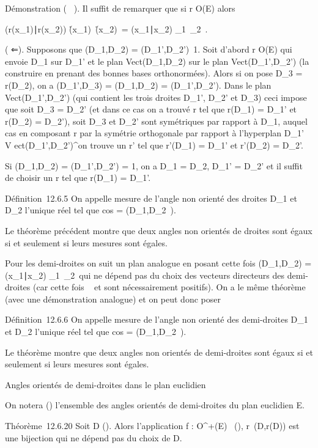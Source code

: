 \documentclass[]{article}
\begin{document}
Démonstration ( \rigtharrow~). Il suffit de remarquer que si r \in O(E) alors


(r(x_1)∣r(x_2))
\over
\r(x_1)\
\r(x_2)\
=
(x_1∣x_2)
\over
\x_1\
\x_2\ .

( ⇐). Supposons que \phi(D_1,D_2) =
\phi(D_1',D_2')\neq~1. Soit
d'abord r \in O(E) qui envoie D_1 sur D_1' et le plan
Vect(D_1,D_2) sur le plan
Vect(D_1',D_2') (la construire en prenant des bonnes
bases orthonormées). Alors si on pose D_3 = r(D_2), on
a \phi(D_1',D_3) = \phi(D_1,D_2) =
\phi(D_1',D_2'). Dans le plan
Vect(D_1',D_2') (qui contient les trois droites
D_1', D_2' et D_3) ceci impose que soit
D_3 = D_2' (et dans ce cas on a trouvé r tel que
r(D_1) = D_1' et r(D_2) = D_2'),
soit D_3 et D_2' sont symétriques par rapport à
D_1, auquel cas en composant r par la symétrie orthogonale par
rapport à l'hyperplan D_1' \oplus~ V
ect(D_1',D_2')^\bot on trouve un r' tel que
r'(D_1) = D_1' et r'(D_2) = D_2'.

Si \phi(D_1,D_2) = \phi(D_1',D_2') = 1, on
a D_1 = D_2, D_1' = D_2' et il
suffit de choisir un r tel que r(D_1) = D_1'.

Définition~12.6.5 On appelle mesure de l'angle non orienté des droites
D_1 et D_2 l'unique réel \theta \in [0,\pi~\diagup2] tel que
cos \theta = \phi(D_1,D_2~).

Le théorème précédent montre que deux angles non orientés de droites
sont égaux si et seulement si leurs mesures sont égales.

Pour les demi-droites on suit un plan analogue en posant cette fois
\phi(D_1,D_2) =
(x_1∣x_2)
\over
\x_1\
\x_2\ \in
[-1,1] qui ne dépend pas du choix des vecteurs directeurs des
demi-droites (car cette fois \lambda~ et \mu sont nécessairement positifs). On a
le même théorème (avec une démonstration analogue) et on peut donc poser

Définition~12.6.6 On appelle mesure de l'angle non orienté des
demi-droites D_1 et D_2 l'unique réel \theta \in [0,\pi~]
tel que cos \theta = \phi(D_1,D_2~).

Le théorème montre que deux angles non orientés de demi-droites sont
égaux si et seulement si leurs mesures sont égales.

Angles orientés de demi-droites dans le plan euclidien

On notera \tildeA() l'ensemble des angles orientés
de demi-droites du plan euclidien E.

Théorème~12.6.20 Soit D \in\tildeD(). Alors
l'application f : O^+(E) \rightarrow~\tildeA(\mathcal{E}),
r\mapsto~\widehat(D,r(D)) est une
bijection qui ne dépend pas du choix de D.
\end{document}
